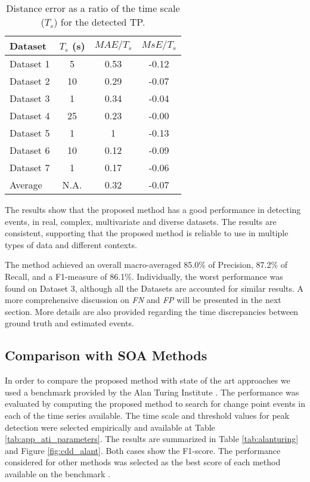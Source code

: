 \begin{table}
	\begin{center}
        \begin{tabular}{lccc}
            \toprule
			Dataset & $T_s$ (s) & $MAE/T_s$ & $MsE/T_s$ \\
			\toprule
			Dataset 1 & 5 & 0.53 & -0.12 \\
			Dataset 2 & 10 & 0.29 & -0.07 \\
			Dataset 3 & 1 & 0.34 & -0.04 \\
			Dataset 4 & 25 & 0.23 & -0.00 \\
			Dataset 5 & 1 & 1 & -0.13 \\
			Dataset 6 & 10 & 0.12 & -0.09 \\
			Dataset 7 & 1 & 0.17 & -0.06 \\
			\midrule
			Average & N.A. & 0.32 & -0.07 \\
			\bottomrule
		\end{tabular}
	\end{center}
	\caption{Distance error as a ratio of the time scale ($T_s$) for the detected TP.}
	\label{tab:overall_cpd_dist}
\end{table}

The results show that the proposed method has a good performance in detecting events, in real, complex, multivariate and diverse datasets. The results are consistent, supporting that the proposed method is reliable to use in multiple types of data and different contexts.
\par
The method achieved an overall macro-averaged 85.0\% of Precision, 87.2\% of Recall, and a F1-measure of 86.1\%. Individually, the worst performance was found on Dataset 3, although all the Datasets are accounted for similar results. A more comprehensive discussion on \textit{FN} and \textit{FP} will be presented in the next section. More details are also provided regarding the time discrepancies between ground truth and estimated events.

\subsection{Comparison with SOA Methods}

In order to compare the proposed method with state of the art approaches we used a benchmark provided by the Alan Turing Institute \cite{cpd_alan}. The performance was evaluated by computing the proposed method to search for change point events in each of the time series available. The time scale and threshold values for peak detection were selected empirically and available at Table \ref{tab:app_ati_parameters}. The results are summarized in Table \ref{tab:alanturing} and Figure \ref{fig:cdd_alant}. Both cases show the F1-score. The performance considered for other methods was selected as the best score of each method available on the benchmark \cite{cpd_alan}.

